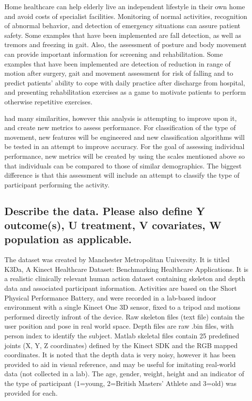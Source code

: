 \documentclass[twoside,11pt]{article}
\begin{document}
 	Home healthcare can help elderly live an independent lifestyle in their own home and avoid costs of specialist facilities.	Monitoring of normal activities, recognition of abnormal behavior, and detection of emergency situations can assure patient safety. Some examples that have been implemented are fall detection, as well as tremors and freezing in gait\citep{cite6}. Also, the assessment of posture and body movement can provide important information for screening and rehabilitation. Some examples that have been implemented are detection of reduction in range of motion after surgery, gait and movement assessment for risk of falling and to predict patients' ability to cope with daily practice after discharge from hospital, and presenting rehabilitation exercises as a game to motivate patients to perform otherwise repetitive exercises\citep{cite3,cite4,cite5}. 
 	
  \citet{cite6} had many similarities, however this analysis is attempting to improve upon it, and create new metrics to assess performance. For classification of the type of movement, new features will be engineered and new classification algorithms will be tested in an attempt to improve accuracy. For the goal of assessing individual performance, new metrics will be created by using the scales mentioned above so that individuals can be compared to those of similar demographics. The biggest difference is that this assessment will include an attempt to classify the type of participant performing the activity.

\subsection{Describe the data. Please also define Y outcome(s), U treatment, V covariates, W population as applicable.}

  The dataset was created by Manchester Metropolitan University. It is titled K3Da, A Kinect Healthcare Dataset: Benchmarking Healthcare Applications. It is a realistic clinically relevant human action dataset containing skeleton and depth data and associated participant information. Activities are based on the Short Physical Performance Battery\citep{cite2}, and were recorded in a lab-based indoor environment with a single Kinect One 3D sensor, fixed to a tripod and motions performed directly infront of the device. Raw skeleton files (text file) contain the user position and pose in real world space. Depth files are raw .bin files, with person index to identify the subject. Matlab skeletal files contain 25 predefined joints (X, Y, Z coordinates) defined by the Kinect SDK and the RGB mapped coordinates. It is noted that the depth data is very noisy, however it has been provided to aid in visual reference, and may be useful for imitating real-world data (not collected in a lab). The age, gender, weight, height and an indicator of the type of participant (1=young, 2=British Masters' Athlete and 3=old) was provided for each\citep{cite7}.
\end{document}
